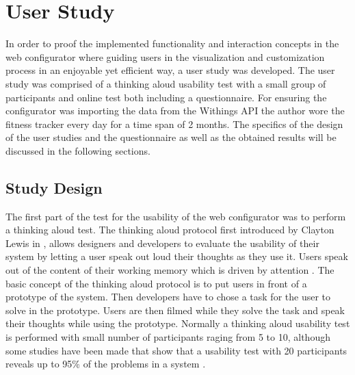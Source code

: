 \documentclass[../medieninformatik-arbeit.tex]{subfiles}
\begin{document}
\section{User Study}
\label{ch:study}
In order to proof the implemented functionality and interaction concepts in the web configurator where guiding users in the visualization and customization process in an enjoyable yet efficient way, a user study was developed. The user study was comprised of a thinking aloud usability test with a small group of participants and online test both including a questionnaire. For ensuring the configurator was importing the data from the Withings API the author wore the fitness tracker every day for a time span of 2 months. The specifics of the design of the user studies and the questionnaire as well as the obtained results will be discussed in the following sections. 

\subsection{Study Design}
The first part of the test for the usability of the web configurator was to perform a thinking aloud test. The thinking aloud protocol first introduced by Clayton Lewis in \cite{lewis1982using}, allows designers and developers to evaluate the usability of their system by letting a user speak out loud their thoughts as they use it. Users speak out of the content of their working memory which is driven by attention \cite{lewis1993task}. The basic concept of the thinking aloud protocol is to put users in front of a prototype of the system. Then developers have to chose a task for the user to solve in the prototype. Users are then filmed while they solve the task and speak their thoughts while using the prototype. Normally a thinking aloud usability test is performed with small number of participants raging from 5 to 10, although some studies have been made that show that a usability test with 20 participants reveals up to 95\% of the problems in a system \cite{vande2008beyond}. 
\end{document}

